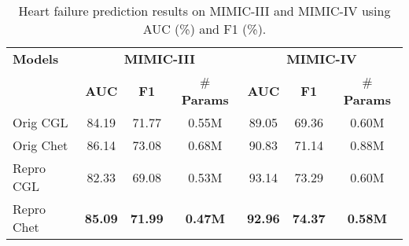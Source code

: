 \documentclass[11pt,a4paper,fleqn]{article}
\begin{document}
\begin{table*}[ht]
  \centering
  \begin{tabular}{lccc|ccc}
  \hline\hline
  {\bf Models} & \multicolumn{3}{c}{\bf MIMIC-III} & \multicolumn{3}{c}{\bf MIMIC-IV} \\
   \cline{2-7} & \bf AUC & \bf F1 & \# \bf Params & \bf AUC & \bf F1 & \# \bf Params \\ \hline
  {Orig CGL} & 84.19 & 71.77 & 0.55M & 89.05 & 69.36 & 0.60M \\
  {Orig Chet} & 86.14 & 73.08 & 0.68M & 90.83 & 71.14 & 0.88M \\
  \hline
  {Repro CGL} & 82.33 & 69.08 & 0.53M & 93.14 & 73.29 & 0.60M \\
  {Repro Chet} & \bf 85.09 & \bf 71.99 & \bf 0.47M & \bf 92.96 & \bf 74.37 & \bf 0.58M \\
  \hline\hline
  \end{tabular}
  \caption{Heart failure prediction results on MIMIC-III and MIMIC-IV using AUC (\%) and F1 (\%).}
  \label{tab:hf}
  \end{table*}
\end{document}
